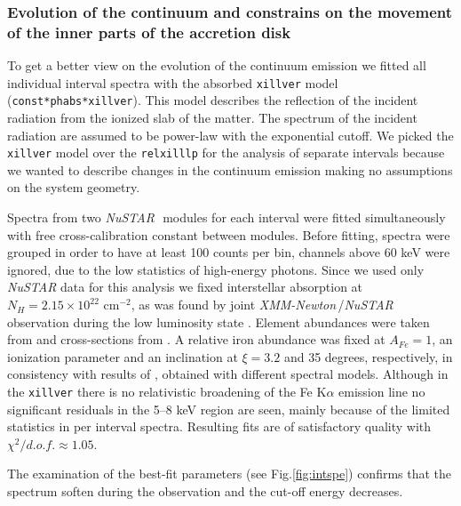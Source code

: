 \documentclass[a4paper,fleqn,usenatbib]{mnras}
\def\xmm{{\em XMM-Newton\,}}
\def\nustar{{\em NuSTAR\,}}
\begin{document}
\subsubsection{Evolution of the continuum and constrains on the movement of the inner parts of the accretion disk}
\label{sec:continuum_evolution}
To get a better view on the evolution of the continuum emission we fitted all individual interval spectra with the absorbed \texttt{xillver} \citep{garcia13} model (\texttt{const*phabs*xillver}). 
This model describes the reflection of the incident radiation from the ionized slab of the matter. 
The spectrum of the incident radiation are assumed to be power-law with the exponential cutoff. 
We picked the \texttt{xillver} model over the \texttt{relxilllp} for the analysis of separate intervals because we wanted to describe changes in the continuum emission making no assumptions on the system geometry. 

Spectra from two \nustar\, modules for each interval were fitted simultaneously with free cross-calibration constant between modules.
Before fitting, spectra were grouped in order to have at least 100 counts per bin, channels above 60 keV were ignored, due to the low statistics of high-energy photons. 
Since we used only {\it NuSTAR} data for this analysis we fixed interstellar absorption at $N_{H} = 2.15\times10^{22}$ cm$^{-2}$, as was found by joint \xmm/\nustar\, observation during the low luminosity state \citep{fuerst16}. 
Element abundances were taken from \cite{wilms00} and cross-sections from \cite{verner96}. 
A relative iron abundance was fixed at  $A_{Fe} = 1$, an ionization parameter and an inclination at $\xi=3.2$ and 35 degrees, respectively, in consistency with results of \citet{miller15_nust}, obtained with different spectral models. 
Although in the \texttt{xillver} there is no relativistic broadening of the Fe K$\alpha$ emission line no significant residuals in the 5--8 keV region are seen, mainly because of the limited statistics in per interval spectra. 
Resulting fits are of satisfactory quality with $\chi^{2}/d.o.f. \approx 1.05$. 
 
The examination of the best-fit parameters (see Fig.\ref{fig:intspe}) confirms that the spectrum soften during the observation and the cut-off energy decreases. 
\end{document}
